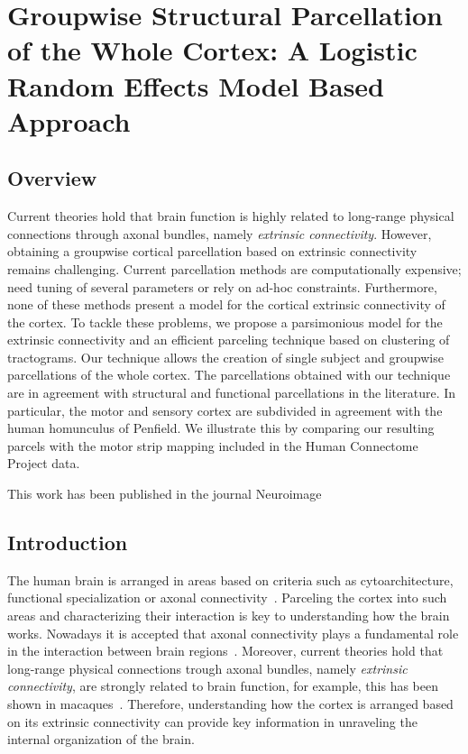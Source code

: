 \chapter{Groupwise Structural Parcellation of the Whole Cortex: A Logistic Random Effects Model Based Approach}
%
%
\section{Overview}
Current theories hold that brain function is highly related to long-range
physical connections through axonal bundles, namely \textit{extrinsic connectivity}.
However, obtaining a groupwise cortical parcellation based on extrinsic connectivity
remains challenging. Current parcellation methods are computationally expensive;
need tuning of several parameters or rely on ad-hoc constraints. Furthermore,
none of these methods present a model for the cortical extrinsic connectivity
of the cortex.
To tackle these problems, we propose a parsimonious model for the 
extrinsic connectivity and an efficient parceling technique based on
clustering of tractograms. Our technique allows the creation of single subject
and groupwise parcellations of the whole cortex. The parcellations obtained with
our technique are in agreement with structural and functional parcellations
in the literature. In particular, the motor and sensory cortex are subdivided
in agreement with the human homunculus of Penfield. We illustrate this by comparing
our resulting parcels with the motor strip mapping included in the Human
Connectome Project data.

This work has been published in the journal Neuroimage \cite{Gallardo2017}
%
\section{Introduction}
%
The human brain is arranged in areas based on criteria such as cytoarchitecture,
functional specialization or axonal connectivity~\citep{Brodmann1909, Thirion2014,
ThiebautdeSchotten2016}. Parceling the cortex into such areas and 
characterizing their interaction is key to understanding how the brain works.
Nowadays it is accepted that axonal connectivity plays a fundamental role in the
interaction between brain regions~\citep{Schmahmann2006}. Moreover, current theories
hold that long-range physical connections trough axonal bundles,
namely \textit{extrinsic connectivity}, are strongly related to brain function, for example,
this has been shown in macaques~\citep{Passingham2002}. Therefore, understanding
how the cortex is arranged based on its extrinsic connectivity can
provide key information in unraveling the internal organization of the brain.

